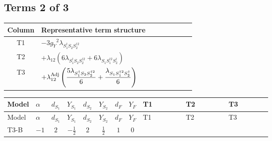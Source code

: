 \documentclass[8pt]{article}
\begin{document}
\begin{landscape}
\subsection*{Terms 2 of 3}
\begin{center}
\begin{tabular}{@{}c >{\raggedright\arraybackslash}p{0.82\linewidth}@{}}
\toprule
Column & Representative term structure \\
\midrule
T1 & \(\displaystyle -3 {g_Y}^2 {\lambda_{S_1^\dagger S_2 S_2^{\dagger 2}}}\) \\
\midrule
T2 & \(\displaystyle +{\lambda_{12}} (6 {\lambda_{S_1^\dagger S_2 S_2^{\dagger 2}}}+6 {\lambda_{S_1 S_1^{\dagger 2}S_2^\dagger}})\) \\
\midrule
T3 & \(\displaystyle +{\lambda_{12}^{\rm Adj}} \left(\frac{5 {\lambda_{S_1^\dagger S_2 S_2^{\dagger 2}}}}{6}+\frac{{\lambda_{S_1 S_1^{\dagger 2}S_2^\dagger}}}{6}\right)\) \\
\midrule
\bottomrule
\end{tabular}
\end{center}
\smallskip
\tiny
\begin{longtable}{@{}llcccccc >{\raggedright\arraybackslash}p{0.21\linewidth} >{\raggedright\arraybackslash}p{0.21\linewidth} >{\raggedright\arraybackslash}p{0.21\linewidth}@{}}
\toprule
Model & $\alpha$ & $d_{S_1}$ & $Y_{S_1}$ & $d_{S_2}$ & $Y_{S_2}$ & $d_F$ & $Y_F$ & T1 & T2 & T3 \\
\midrule
\endfirsthead
\toprule
Model & $\alpha$ & $d_{S_1}$ & $Y_{S_1}$ & $d_{S_2}$ & $Y_{S_2}$ & $d_F$ & $Y_F$ & T1 & T2 & T3 \\
\midrule
\endhead
T3-B & $-1$ & $2$ & $-\frac{1}{2}$ & $2$ & $\frac{1}{2}$ & $1$ & $0$ & \scriptsize\adjustbox{max width=\linewidth}{$\begin{gathered} -3 {g_Y}^2 {\lambda_{S_1^\dagger S_2 S_2^{\dagger 2}}}\end{gathered}$} & \scriptsize\adjustbox{max width=\linewidth}{$\begin{gathered} +{\lambda_{12}} (6 {\lambda_{S_1^\dagger S_2 S_2^{\dagger 2}}}+6 {\lambda_{S_1 S_1^{\dagger 2}S_2^\dagger}})\end{gathered}$} & \scriptsize\adjustbox{max width=\linewidth}{$\begin{gathered} +{\lambda_{12}^{\rm Adj}} \left(\frac{5 {\lambda_{S_1^\dagger S_2 S_2^{\dagger 2}}}}{6}+\frac{{\lambda_{S_1 S_1^{\dagger 2}S_2^\dagger}}}{6}\right)\end{gathered}$} \\
\midrule

\end{longtable}
\end{landscape}
\end{document}
